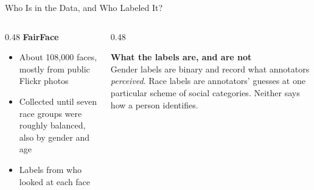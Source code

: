 \begin{frame}{Who Is in the Data, and Who Labeled It?}
\begin{columns}[T]
\begin{column}{0.48\textwidth}
\textbf{FairFace} 
\begin{itemize}
\item About 108,000 faces, mostly from public Flickr photos
\item Collected until seven race groups were roughly balanced, also by gender and age
\item Labels from  who looked at each face
\end{itemize}
\end{column}
\begin{column}{0.48\textwidth}
\begin{warnbox}
\textbf{What the labels are, and are not}\\
Gender labels are binary and record what annotators \emph{perceived}. Race labels are annotators'
guesses at one particular scheme of social categories. Neither says how a person identifies.
\end{warnbox}
\end{column}
\end{columns}
\end{frame}


